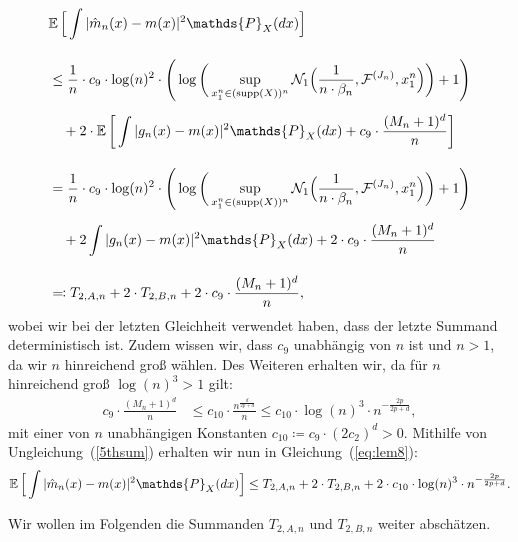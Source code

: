 \begin{equation}
\label{eq:lem8}
\begin{split}
& \E \Big[\int |\hat{m}_n(x) - m(x)|^2 \mathds{P}_X(dx)\Big] \\[1em] 
& \leq \frac{1}{n} \cdot c_9 \cdot \log(n)^2 \cdot \Bigg(\log\bigg(\sup_{x_1^n \in (\supp(X))^n}\mathcal{N}_1\Big(\frac{1}{n \cdot \beta_n},\mathcal{F}^{(J_n)},x_1^n\Big)\bigg) + 1\Bigg) \\[0.5em]
& \quad + 2 \cdot \E\bigg[\int |g_{n}(x) - m(x)|^2 \mathds{P}_X(dx) + c_9 \cdot \frac{(M_n + 1)^d}{n}\bigg] \\[1em]
& = \frac{1}{n} \cdot c_9 \cdot \log(n)^2 \cdot \Bigg(\log\bigg(\sup_{x_1^n \in (\supp(X))^n}\mathcal{N}_1\Big(\frac{1}{n \cdot \beta_n},\mathcal{F}^{(J_n)},x_1^n\Big)\bigg) + 1\Bigg) \\[0.5em]
& \quad + 2 \int |g_{n}(x) - m(x)|^2 \mathds{P}_X(dx) + 2 \cdot c_9 \cdot \frac{(M_n + 1)^d}{n} \\[1em] 
& \eqqcolon T_{2,A,n} + 2 \cdot T_{2,B,n} + 2 \cdot c_9 \cdot \frac{(M_n + 1)^d}{n},
\end{split}
\end{equation}
wobei wir bei der letzten Gleichheit verwendet haben, dass der letzte Summand deterministisch ist. Zudem wissen wir, dass $c_9$ unabhängig von $n$ ist und $n > 1$, da wir $n$ hinreichend groß wählen.
Des Weiteren erhalten wir, da für $n$ hinreichend groß $\log(n)^3 > 1$ gilt:
\begin{equation}
\label{5thsum}
\begin{split}
c_9 \cdot \frac{(M_n + 1)^d}{n} & \leq c_{10} \cdot \frac{n^{\frac{d}{2p + d}}}{n} \leq c_{10} \cdot \log(n)^3 \cdot n^{- \frac{2p}{2p + d}} ,
\end{split}
\end{equation} 
mit einer von $n$ unabhängigen Konstanten $c_{10} \coloneqq c_9 \cdot (2c_2)^d > 0$.
Mithilfe von Ungleichung~(\ref{5thsum}) erhalten wir nun in Gleichung~(\ref{eq:lem8}):
$$
\E \Big[\int |\hat{m}_n(x) - m(x)|^2 \mathds{P}_X(dx)\Big] \leq T_{2,A,n} + 2 \cdot T_{2,B,n} + 2 \cdot c_{10} \cdot \log(n)^3 \cdot n^{- \frac{2p}{2p + d}}.
$$

Wir wollen im Folgenden die Summanden $T_{2,A,n}$ und $T_{2,B,n}$ weiter abschätzen.

